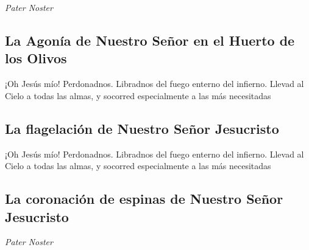 \documentclass[a4paper,11pt, oneside]{report}
\begin{document}
  \textit{Pater Noster}

    \subsection*{ La Agonía de Nuestro Señor en el Huerto de los Olivos }
      

      \indent¡Oh Jesús mío! Perdonadnos. Libradnos del fuego enterno del infierno. Llevad al Cielo a todas las almas, y socorred especialmente a las más 
      necesitadas

    \subsection*{ La flagelación de Nuestro Señor Jesucristo }
      
      
      \indent¡Oh Jesús mío! Perdonadnos. Libradnos del fuego enterno del infierno. Llevad al Cielo a todas las almas, y socorred especialmente a las más 
      necesitadas
      
    \subsection*{ La coronación de espinas de Nuestro Señor Jesucristo }
      
      \textit{Pater Noster}
\end{document}
